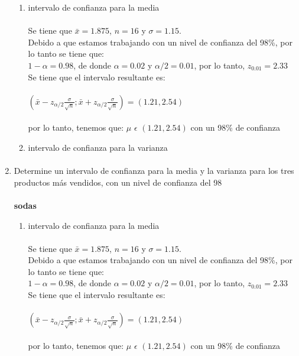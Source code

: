 \documentclass{article}
\begin{document}
\begin{enumerate}
    \begin{enumerate}{}
       
        \item{intervalo de confianza para la media}
            \paragraph{}Se tiene que $\bar{x}=1.875$, $n=16$ y $\sigma=1.15$.\\
            Debido a que estamos trabajando con un nivel de confianza del 98\%, por lo tanto se tiene que:\\ 
            $1-\alpha=0.98$, de donde $\alpha=0.02 $ y $\alpha/2=0.01$, por lo tanto, $z_{0.01}=2.33$ 
            Se tiene que el intervalo resultante es: \\\\
            $(\bar{x}-z_{\alpha/2}\frac{\sigma}{\sqrt{n}};\bar{x}+z_{\alpha/2}\frac{\sigma}{\sqrt{n}})=(1.21,2.54)$\\\\
            por lo tanto, tenemos que: $\mu$ $\epsilon$ $(1.21,2.54)$ con un 98\% de confianza
        
        \item {intervalo de confianza para la varianza}
        \paragraph{}
    \end{enumerate}
    \item Determine un intervalo de confianza para la media y la varianza para los tres productos más vendidos, con un nivel de confianza del 98%
    \paragraph*{}\textbf{sodas}\\
    \begin{enumerate}{}
       
      \item{intervalo de confianza para la media}
          \paragraph{}Se tiene que $\bar{x}=1.875$, $n=16$ y $\sigma=1.15$.\\
          Debido a que estamos trabajando con un nivel de confianza del 98\%, por lo tanto se tiene que:\\ 
          $1-\alpha=0.98$, de donde $\alpha=0.02 $ y $\alpha/2=0.01$, por lo tanto, $z_{0.01}=2.33$ 
          Se tiene que el intervalo resultante es: \\\\
          $(\bar{x}-z_{\alpha/2}\frac{\sigma}{\sqrt{n}};\bar{x}+z_{\alpha/2}\frac{\sigma}{\sqrt{n}})=(1.21,2.54)$\\\\
          por lo tanto, tenemos que: $\mu$ $\epsilon$ $(1.21,2.54)$ con un 98\% de confianza
      

\end{enumerate}
\end{enumerate}
\end{document}
